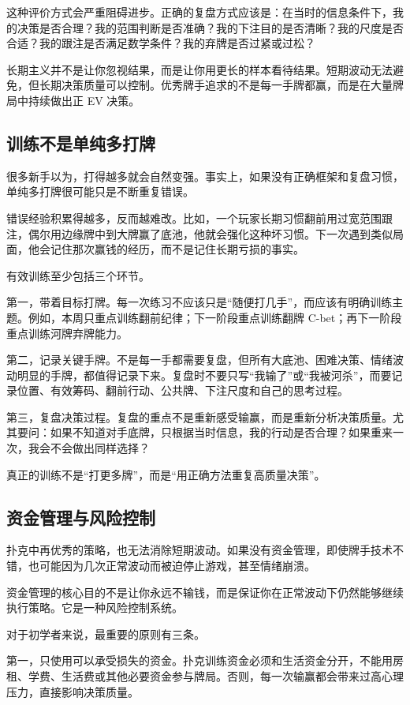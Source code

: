 这种评价方式会严重阻碍进步。正确的复盘方式应该是：在当时的信息条件下，我的决策是否合理？我的范围判断是否准确？我的下注目的是否清晰？我的尺度是否合适？我的跟注是否满足数学条件？我的弃牌是否过紧或过松？

长期主义并不是让你忽视结果，而是让你用更长的样本看待结果。短期波动无法避免，但长期决策质量可以控制。优秀牌手追求的不是每一手牌都赢，而是在大量牌局中持续做出正 EV 决策。

\subsection{训练不是单纯多打牌}

很多新手以为，打得越多就会自然变强。事实上，如果没有正确框架和复盘习惯，单纯多打牌很可能只是不断重复错误。

错误经验积累得越多，反而越难改。比如，一个玩家长期习惯翻前用过宽范围跟注，偶尔用边缘牌中到大牌赢了底池，他就会强化这种坏习惯。下一次遇到类似局面，他会记住那次赢钱的经历，而不是记住长期亏损的事实。

有效训练至少包括三个环节。

第一，带着目标打牌。每一次练习不应该只是“随便打几手”，而应该有明确训练主题。例如，本周只重点训练翻前纪律；下一阶段重点训练翻牌 C-bet；再下一阶段重点训练河牌弃牌能力。

第二，记录关键手牌。不是每一手都需要复盘，但所有大底池、困难决策、情绪波动明显的手牌，都值得记录下来。复盘时不要只写“我输了”或“我被河杀”，而要记录位置、有效筹码、翻前行动、公共牌、下注尺度和自己的思考过程。

第三，复盘决策过程。复盘的重点不是重新感受输赢，而是重新分析决策质量。尤其要问：如果不知道对手底牌，只根据当时信息，我的行动是否合理？如果重来一次，我会不会做出同样选择？

真正的训练不是“打更多牌”，而是“用正确方法重复高质量决策”。

\subsection{资金管理与风险控制}

扑克中再优秀的策略，也无法消除短期波动。如果没有资金管理，即使牌手技术不错，也可能因为几次正常波动而被迫停止游戏，甚至情绪崩溃。

资金管理的核心目的不是让你永远不输钱，而是保证你在正常波动下仍然能够继续执行策略。它是一种风险控制系统。

对于初学者来说，最重要的原则有三条。

第一，只使用可以承受损失的资金。扑克训练资金必须和生活资金分开，不能用房租、学费、生活费或其他必要资金参与牌局。否则，每一次输赢都会带来过高心理压力，直接影响决策质量。

